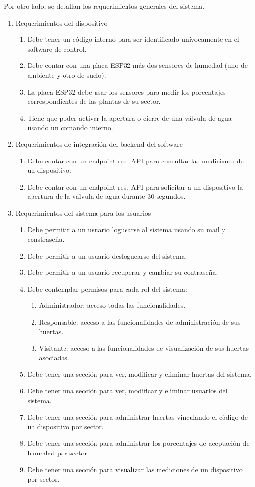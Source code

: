 Por otro lado, se detallan los requerimientos generales del sistema.
\begin{enumerate}
	\item Requerimientos del dispositivo
		\begin{enumerate}
			\item Debe tener un código interno para ser identificado unívocamente en el software de control.
			\item Debe contar con una placa ESP32 más dos sensores de humedad (uno de ambiente y otro de suelo).
			\item La placa ESP32 debe usar los sensores para medir los porcentajes correspondientes de las plantas de su sector. 
			\item Tiene que poder activar la apertura o cierre de una válvula de agua usando un comando interno.
		\end{enumerate}
	
	\item Requerimientos de integración del backend del software
		\begin{enumerate}
			\item Debe contar con un endpoint rest API para consultar las mediciones de un dispositivo.
			\item Debe contar con un endpoint rest API para solicitar a un dispositivo la apertura de la válvula de agua durante 30 segundos.
			\end{enumerate}

	\item Requerimientos del sistema para los usuarios
		\begin{enumerate}
			\item Debe permitir a un usuario loguearse al sistema usando su mail y constraseña.
			\item Debe permitir a un usuario desloguearse del sistema.
			\item Debe permitir a un usuario recuperar y cambiar su contraseña.
			\item Debe contemplar permisos para cada rol del sistema:
			\begin{enumerate}
			\item Administrador: acceso todas las funcionalidades.
			\item Responsable: acceso a las funcionalidades de administración de sus huertas.
			\item Visitante: acceso a las funcionalidades de visualización de sus huertas asociadas.
			\end{enumerate}
			\item Debe tener una sección para ver, modificar y eliminar huertas del sistema.
			\item Debe tener una sección para ver, modificar y eliminar usuarios del sistema.
			\item Debe tener una sección para administrar huertas vinculando el código de un dispositivo por sector.
			\item Debe tener una sección para administrar los porcentajes de aceptación de humedad por sector.
			\item Debe tener una sección para visualizar las mediciones de un dispositivo por sector.
		\end{enumerate}		
\end{enumerate}
